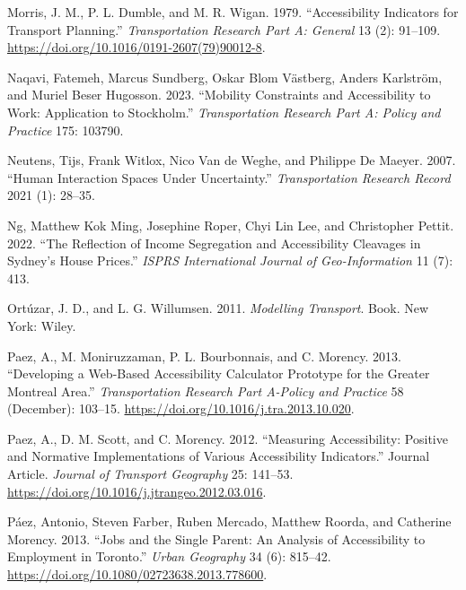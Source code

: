 \documentclass[
]{article}
\newlength{\cslhangindent}
\newenvironment{CSLReferences}[2] %
 {\begin{list}{}{%
  \setlength{\itemindent}{0pt}
  \setlength{\leftmargin}{0pt}
  \setlength{\parsep}{0pt}
  \ifodd #1
   \setlength{\leftmargin}{\cslhangindent}
   \setlength{\itemindent}{-1\cslhangindent}
  \fi
  \setlength{\itemsep}{#2\baselineskip}}}
 {\end{list}}
\begin{document}
\begin{CSLReferences}{1}{0}
Morris, J. M., P. L. Dumble, and M. R. Wigan. 1979. {``Accessibility
Indicators for Transport Planning.''} \emph{Transportation Research Part
A: General} 13 (2): 91--109.
\url{https://doi.org/10.1016/0191-2607(79)90012-8}.

Naqavi, Fatemeh, Marcus Sundberg, Oskar Blom Västberg, Anders Karlström,
and Muriel Beser Hugosson. 2023. {``Mobility Constraints and
Accessibility to Work: Application to Stockholm.''} \emph{Transportation
Research Part A: Policy and Practice} 175: 103790.

Neutens, Tijs, Frank Witlox, Nico Van de Weghe, and Philippe De Maeyer.
2007. {``Human Interaction Spaces Under Uncertainty.''}
\emph{Transportation Research Record} 2021 (1): 28--35.

Ng, Matthew Kok Ming, Josephine Roper, Chyi Lin Lee, and Christopher
Pettit. 2022. {``The Reflection of Income Segregation and Accessibility
Cleavages in Sydney's House Prices.''} \emph{ISPRS International Journal
of Geo-Information} 11 (7): 413.

Ortúzar, J. D., and L. G. Willumsen. 2011. \emph{Modelling Transport}.
Book. New York: Wiley.

Paez, A., M. Moniruzzaman, P. L. Bourbonnais, and C. Morency. 2013.
{``Developing a Web-Based Accessibility Calculator Prototype for the
{Greater} {Montreal} {Area}.''} \emph{Transportation Research Part
A-Policy and Practice} 58 (December): 103--15.
\url{https://doi.org/10.1016/j.tra.2013.10.020}.

Paez, A., D. M. Scott, and C. Morency. 2012. {``Measuring Accessibility:
Positive and Normative Implementations of Various Accessibility
Indicators.''} Journal Article. \emph{Journal of Transport Geography}
25: 141--53. \url{https://doi.org/10.1016/j.jtrangeo.2012.03.016}.

Páez, Antonio, Steven Farber, Ruben Mercado, Matthew Roorda, and
Catherine Morency. 2013. {``Jobs and the {Single} {Parent}: {An}
{Analysis} of {Accessibility} to {Employment} in {Toronto}.''}
\emph{Urban Geography} 34 (6): 815--42.
\url{https://doi.org/10.1080/02723638.2013.778600}.


\end{CSLReferences}
\end{document}
